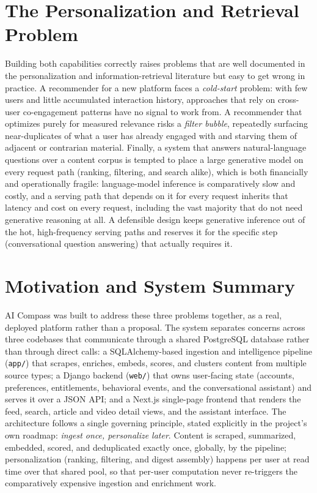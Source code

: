 \section{The Personalization and Retrieval Problem}

Building both capabilities correctly raises problems that are well documented in the personalization and information-retrieval literature but easy to get wrong in practice. A recommender for a new platform faces a \emph{cold-start} problem: with few users and little accumulated interaction history, approaches that rely on cross-user co-engagement patterns have no signal to work from. A recommender that optimizes purely for measured relevance risks a \emph{filter bubble}, repeatedly surfacing near-duplicates of what a user has already engaged with and starving them of adjacent or contrarian material. Finally, a system that answers natural-language questions over a content corpus is tempted to place a large generative model on every request path (ranking, filtering, and search alike), which is both financially and operationally fragile: language-model inference is comparatively slow and costly, and a serving path that depends on it for every request inherits that latency and cost on every request, including the vast majority that do not need generative reasoning at all. A defensible design keeps generative inference out of the hot, high-frequency serving paths and reserves it for the specific step (conversational question answering) that actually requires it.

\section{Motivation and System Summary}

AI Compass was built to address these three problems together, as a real, deployed platform rather than a proposal. The system separates concerns across three codebases that communicate through a shared PostgreSQL database rather than through direct calls: a SQLAlchemy-based ingestion and intelligence pipeline (\texttt{app/}) that scrapes, enriches, embeds, scores, and clusters content from multiple source types; a Django backend (\texttt{web/}) that owns user-facing state (accounts, preferences, entitlements, behavioral events, and the conversational assistant) and serves it over a JSON API; and a Next.js single-page frontend that renders the feed, search, article and video detail views, and the assistant interface. The architecture follows a single governing principle, stated explicitly in the project's own roadmap: \emph{ingest once, personalize later}. Content is scraped, summarized, embedded, scored, and deduplicated exactly once, globally, by the pipeline; personalization (ranking, filtering, and digest assembly) happens per user at read time over that shared pool, so that per-user computation never re-triggers the comparatively expensive ingestion and enrichment work.

